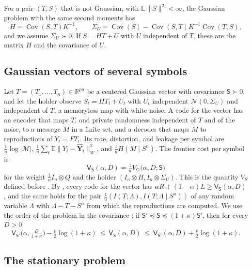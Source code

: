 \documentclass[11pt,onecolumn]{IEEEtran}
\newcommand{\E}{\mathbb{E}}
\newcommand{\R}{\mathbb{R}}
\newcommand{\Cov}{\operatorname{Cov}}
\newcommand{\hY}{\hat{\mathbf Y}}
\newcommand{\VG}{V_{\mathrm G}}
\begin{document}
For a pair $(T,S)$ that is not Gaussian, with $\E\|S\|^2<\infty$, the
Gaussian problem with the same second moments has
\begin{equation}
H=\Cov(S,T)K^{-1},\qquad\Sigma_U=\Cov(S)-\Cov(S,T)K^{-1}\Cov(T,S),
\label{eq:moments}
\end{equation}
and we assume $\Sigma_U\succ0$. If $S=HT+U$ with $U$ independent of $T$,
these are the matrix $H$ and the covariance of $U$.

\subsection{Gaussian vectors of several symbols}

Let $T=(T_1,\dots,T_n)\in\R^{pn}$ be a centered Gaussian vector with
covariance $\mathsf S\succ0$, and let the holder observe
$S_t=HT_t+U_t$ with $U_t$ independent $\mathcal N(0,\Sigma_U)$ and
independent of $T$, a memoryless map with white noise. A code for the
vector has an encoder that maps $T$, and private randomness
independent of $T$ and of the noise, to a message $M$ in a finite set,
and a decoder that maps $M$ to reproductions of $Y_t=FT_t$. Its rate,
distortion, and leakage per symbol are $\tfrac1n\log|\mathcal M|$,
$\tfrac1n\sum_t\E\|Y_t-\hY_t\|_W^2$, and $\tfrac1nH(M\mid S^n)$. The
frontier cost per symbol is
\[
\mathsf V_{\mathsf S}(\alpha,D)=\tfrac1n\VG\bigl(\alpha,D;\mathsf S\bigr)
\]
for the weight $\tfrac1nI_n\otimes Q$ and the holder
$(I_n\otimes H,I_n\otimes\Sigma_U)$. This is the quantity $V_S$ defined
before \cite[Lemma~11]{part2}. By \cite[Proposition~2]{part1}, every code for
the vector has $\alpha R+(1-\alpha)L\ge\mathsf V_{\mathsf S}(\alpha,D)$,
and the same holds for the pair $\tfrac1n(I(T;\Lambda),I(T;\Lambda\mid S^n))$
of any random variable $\Lambda$ with $\Lambda-T-S^n$ from which the
reproductions are computed. We use the order of the problem in the
covariance \cite[Lemma~11(b)]{part2}: if
$\mathsf S'\preceq\mathsf S\preceq(1+\kappa)\mathsf S'$, then for every
$D>0$
\begin{equation}
\mathsf V_{\mathsf S'}\bigl(\alpha,\tfrac{D}{1+\kappa}\bigr)-\tfrac p2\log(1+\kappa)\ \le\ \mathsf V_{\mathsf S}(\alpha,D)\ \le\ \mathsf V_{\mathsf S'}(\alpha,D)+\tfrac p2\log(1+\kappa).
\label{eq:order}
\end{equation}

\subsection{The stationary problem}
\end{document}

